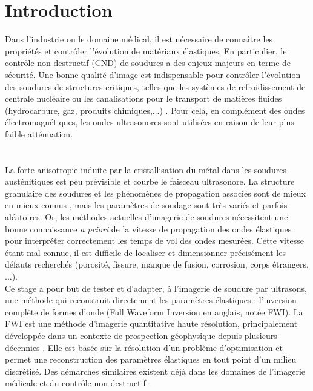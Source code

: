 \chapter*{Introduction}

Dans l'industrie ou le domaine médical, il est nécessaire de connaître les propriétés et contrôler l'évolution de matériaux élastiques. En particulier, le contrôle non-destructif (CND) de soudures a des enjeux majeurs en terme de sécurité. Une bonne qualité d'image est indispensable pour contrôler l'évolution des soudures de structures critiques, telles que les systèmes de refroidissement de centrale nucléaire ou les canalisations pour le transport de matières fluides (hydrocarbure, gaz, produits chimiques,...) .  Pour cela, en complément des ondes électromagnétiques,  les ondes ultrasonores sont utilisées en raison de leur plus faible atténuation.\\~\\ \\

La forte anisotropie induite par la cristallisation du métal dans les soudures austénitiques est peu prévisible et courbe le faisceau ultrasonore. La structure granulaire des soudures et les phénomènes de propagation associés sont de mieux en mieux connus \citep{moysan}, mais les paramètres de soudage sont très variés \citep{chassignole} et parfois aléatoires. Or, les méthodes actuelles d'imagerie de soudures nécessitent une bonne connaissance \emph{a priori} de la vitesse de propagation des ondes élastiques pour interpréter correctement les temps de vol des ondes mesurées.  Cette vitesse étant mal connue, il est difficile de localiser et dimensionner précisément les défauts recherchés (porosité, fissure, manque de fusion, corrosion, corps étrangers, ...).\\ 


Ce stage a pour but de tester et d'adapter, à l'imagerie de soudure par ultrasons, une méthode qui reconstruit directement les paramètres élastiques :  l'inversion complète de formes d'onde (Full Waveform Inversion en anglais, notée FWI). La FWI est une méthode d'imagerie quantitative haute résolution, principalement développée dans un contexte de prospection géophysique depuis plusieurs décennies \citep{tarantola_84}. Elle est basée sur la résolution d'un problème d'optimisation et permet une reconstruction des paramètres élastiques en tout point d'un milieu discrétisé. Des démarches similaires existent déjà dans les domaines de l'imagerie médicale \citep{devaney_82} et du contrôle non destructif \citep{dominguez}. \\

